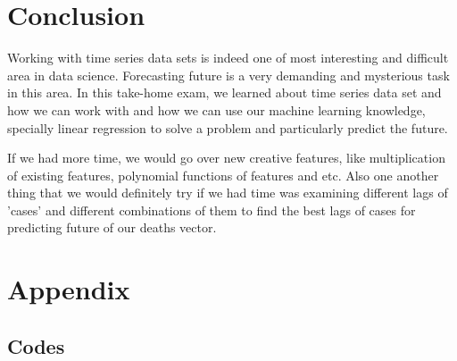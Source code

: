 \documentclass{article}
\begin{document}
\section{Conclusion}
Working with time series data sets is indeed one of most interesting and difficult area in data science. Forecasting future is a very demanding and mysterious task in this area. In this take-home exam, we learned about time series data set and how we can work with and how we can use our machine learning knowledge, specially linear regression to solve a problem and particularly predict the future. 

If we had more time, we would go over new creative features, like multiplication of existing features, polynomial functions of features and etc. Also one another thing that we would definitely try if we had time was examining different lags of 'cases' and different combinations of them to find the best lags of cases for predicting future of our deaths vector.
\newpage

\section*{Appendix}

\subsection*{Codes}


\end{document}
